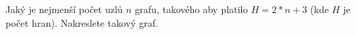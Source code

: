 \subsubsection{}
Jaký je nejmenší počet uzlů $n$ grafu, takového aby platilo $H=2*n+3$ (kde $H$
je počet hran). Nakreslete takový graf.
